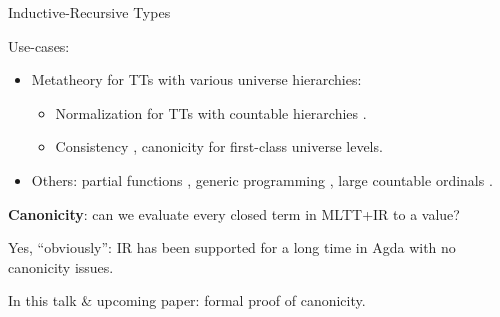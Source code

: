 \documentclass[dvipsnames,aspectratio=169]{beamer}
\begin{document}
\begin{frame}{Inductive-Recursive Types}

Use-cases:
\begin{itemize}
\item Metatheory for TTs with various universe hierarchies:
  \begin{itemize}
    \item Normalization for TTs with countable hierarchies \cite{martin1975intuitionistic,DBLP:journals/pacmpl/0001OV18,DBLP:journals/pacmpl/PujetT23,DBLP:journals/pacmpl/AbelDE23}.
    \item Consistency \cite{first-class-univ}, canonicity \cite{DBLP:journals/corr/abs-2502-20485} for first-class universe levels.
  \end{itemize}
\item Others: partial functions \cite{DBLP:conf/tphol/BoveC01}, generic programming \cite{DBLP:journals/njc/BenkeDJ03,diehl2017fully}, large countable ordinals \cite{ir-ordinals,btb-ordinal}.
\end{itemize}
\vspace{1em}
\pause

\textbf{Canonicity}: can we evaluate every closed term in MLTT+IR to a value?
\vspace{1em}

Yes, ``obviously'': IR has been supported for a long time in Agda with no canonicity issues.
\vspace{1em}
\pause

In this talk \& upcoming paper: formal proof of canonicity.
\end{frame}
\end{document}
